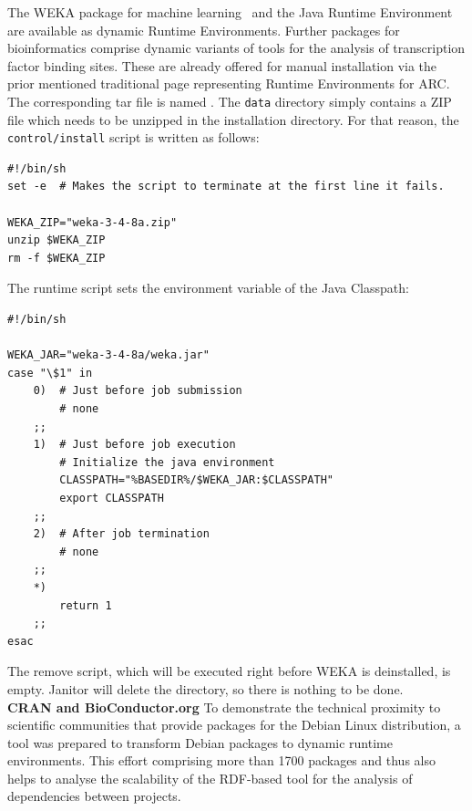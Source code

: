 The WEKA package for machine learning~\cite{FRANK_20074} and the Java Runtime Environment
are available as dynamic Runtime Environments. Further packages for bioinformatics comprise dynamic
variants of tools for the analysis of transcription factor binding sites. These are already offered for manual
installation via the prior mentioned traditional page representing Runtime Environments for ARC. 
The corresponding tar file is named . The \texttt{data} directory simply contains a ZIP file
which needs to be unzipped in the installation directory. For that reason, the \texttt{control/install} script is 
written as follows:
\begin{verbatim} 
#!/bin/sh
set -e  # Makes the script to terminate at the first line it fails.

WEKA_ZIP="weka-3-4-8a.zip"
unzip $WEKA_ZIP
rm -f $WEKA_ZIP
\end{verbatim}
The runtime script sets the environment variable of the Java Classpath:
\begin{verbatim}
#!/bin/sh

WEKA_JAR="weka-3-4-8a/weka.jar"
case "\$1" in
	0)	# Just before job submission
		# none
	;;
	1)	# Just before job execution
		# Initialize the java environment
		CLASSPATH="%BASEDIR%/$WEKA_JAR:$CLASSPATH"
		export CLASSPATH
	;;
	2)	# After job termination
		# none
	;;
	*)
		return 1
	;;
esac	
\end{verbatim}
The remove script, which will be executed right before WEKA is deinstalled, is empty. Janitor will delete the directory, so there
is nothing to be done.\\



\textbf{CRAN and BioConductor.org} To demonstrate the technical proximity to scientific communities that
provide packages for the Debian Linux distribution, a tool was prepared to transform Debian packages to
dynamic runtime environments\cite{MOELLER_2007}. This effort comprising more than 1700 packages and
thus also helps to analyse the scalability of the RDF-based tool for the analysis of dependencies between
projects.  \\


